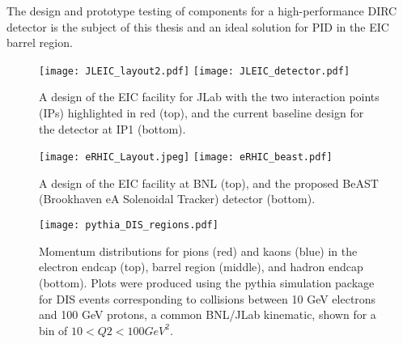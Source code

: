The design and prototype testing of components for a high-performance DIRC detector is the subject of this thesis and an ideal solution for PID in the EIC barrel region.


\begin{figure}[!htb]
	\centering
	\texttt{[image: JLEIC\_layout2.pdf]}
	\texttt{[image: JLEIC\_detector.pdf]}
	\caption{A design of the EIC facility for JLab with the two interaction points (IPs) highlighted in red (top), and the current baseline design for the detector at IP1 (bottom).}
	\label{fig:jleic_layout}
\end{figure}

\begin{figure}[!htb]
	\centering
	\texttt{[image: eRHIC\_Layout.jpeg]}
	\texttt{[image: eRHIC\_beast.pdf]}
	\caption{A design of the EIC facility at BNL (top), and the proposed BeAST (Brookhaven eA Solenoidal Tracker) detector (bottom).}
	\label{fig:erhic_layout}
\end{figure}

\begin{figure}[!htb]
	\centering
	\texttt{[image: pythia\_DIS\_regions.pdf]}
	\caption{Momentum distributions for pions (red) and kaons (blue) in the electron endcap (top), barrel region (middle), and hadron endcap (bottom). Plots were produced using the pythia simulation package for DIS events corresponding to collisions between 10 GeV electrons and 100 GeV protons, a common BNL/JLab kinematic, shown for a bin of $10<Q2<100\unit{GeV}^2$.}
	\label{fig:pythia_DIS}
\end{figure}
